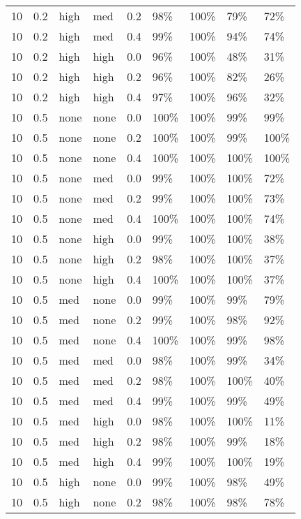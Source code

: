 \begin{longtable}{rrllrllll}
  10 & 0.2 & high & med & 0.2 & 98\% & 100\% & 79\% & 72\% \\ 
  10 & 0.2 & high & med & 0.4 & 99\% & 100\% & 94\% & 74\% \\ 
  10 & 0.2 & high & high & 0.0 & 96\% & 100\% & 48\% & 31\% \\ 
  10 & 0.2 & high & high & 0.2 & 96\% & 100\% & 82\% & 26\% \\ 
  10 & 0.2 & high & high & 0.4 & 97\% & 100\% & 96\% & 32\% \\ 
  10 & 0.5 & none & none & 0.0 & 100\% & 100\% & 99\% & 99\% \\ 
  10 & 0.5 & none & none & 0.2 & 100\% & 100\% & 99\% & 100\% \\ 
  10 & 0.5 & none & none & 0.4 & 100\% & 100\% & 100\% & 100\% \\ 
  10 & 0.5 & none & med & 0.0 & 99\% & 100\% & 100\% & 72\% \\ 
  10 & 0.5 & none & med & 0.2 & 99\% & 100\% & 100\% & 73\% \\ 
  10 & 0.5 & none & med & 0.4 & 100\% & 100\% & 100\% & 74\% \\ 
  10 & 0.5 & none & high & 0.0 & 99\% & 100\% & 100\% & 38\% \\ 
  10 & 0.5 & none & high & 0.2 & 98\% & 100\% & 100\% & 37\% \\ 
  10 & 0.5 & none & high & 0.4 & 100\% & 100\% & 100\% & 37\% \\ 
  10 & 0.5 & med & none & 0.0 & 99\% & 100\% & 99\% & 79\% \\ 
  10 & 0.5 & med & none & 0.2 & 99\% & 100\% & 98\% & 92\% \\ 
  10 & 0.5 & med & none & 0.4 & 100\% & 100\% & 99\% & 98\% \\ 
  10 & 0.5 & med & med & 0.0 & 98\% & 100\% & 99\% & 34\% \\ 
  10 & 0.5 & med & med & 0.2 & 98\% & 100\% & 100\% & 40\% \\ 
  10 & 0.5 & med & med & 0.4 & 99\% & 100\% & 99\% & 49\% \\ 
  10 & 0.5 & med & high & 0.0 & 98\% & 100\% & 100\% & 11\% \\ 
  10 & 0.5 & med & high & 0.2 & 98\% & 100\% & 99\% & 18\% \\ 
  10 & 0.5 & med & high & 0.4 & 99\% & 100\% & 100\% & 19\% \\ 
  10 & 0.5 & high & none & 0.0 & 99\% & 100\% & 98\% & 49\% \\ 
  10 & 0.5 & high & none & 0.2 & 98\% & 100\% & 98\% & 78\% \\ 

\end{longtable}

